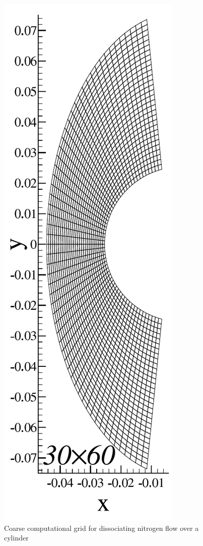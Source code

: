 \begin{figure}[hbtp]
  \begin{center}
    \includegraphics[height=0.5\textheight]{figures/hornung_N2_cylinder/mesh}
    \caption{Coarse computational grid for dissociating nitrogen flow over a cylinder\label{fig:hornung_cyl_n2_30x60}}
  \end{center}
\end{figure}

